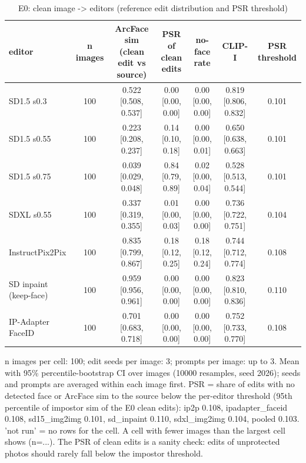 \begin{table}[t]
\centering
\small
\begin{tabular}{lcccccc}
\toprule
editor & n images & ArcFace sim (clean edit vs source) & PSR of clean edits & no-face rate & CLIP-I & PSR threshold \\
\midrule
SD1.5 s0.3 & 100 & 0.522 [0.508, 0.537] & 0.00 [0.00, 0.00] & 0.00 [0.00, 0.00] & 0.819 [0.806, 0.832] & 0.101 \\
SD1.5 s0.55 & 100 & 0.223 [0.208, 0.237] & 0.14 [0.10, 0.18] & 0.00 [0.00, 0.01] & 0.650 [0.638, 0.663] & 0.101 \\
SD1.5 s0.75 & 100 & 0.039 [0.029, 0.048] & 0.84 [0.79, 0.89] & 0.02 [0.00, 0.04] & 0.528 [0.513, 0.544] & 0.101 \\
SDXL s0.55 & 100 & 0.337 [0.319, 0.355] & 0.01 [0.00, 0.03] & 0.00 [0.00, 0.00] & 0.736 [0.722, 0.751] & 0.104 \\
InstructPix2Pix & 100 & 0.835 [0.799, 0.867] & 0.18 [0.12, 0.25] & 0.18 [0.12, 0.24] & 0.744 [0.712, 0.774] & 0.108 \\
SD inpaint (keep-face) & 100 & 0.959 [0.956, 0.961] & 0.00 [0.00, 0.00] & 0.00 [0.00, 0.00] & 0.823 [0.810, 0.836] & 0.110 \\
IP-Adapter FaceID & 100 & 0.701 [0.683, 0.718] & 0.00 [0.00, 0.00] & 0.00 [0.00, 0.00] & 0.752 [0.733, 0.770] & 0.108 \\
\bottomrule
\end{tabular}
\caption{E0: clean image -> editors (reference edit distribution and PSR threshold)}
\label{tab:e0}
\par\footnotesize n images per cell: 100; edit seeds per image: 3; prompts per image: up to 3. Mean with 95\% percentile-bootstrap CI over images (10000 resamples, seed 2026); seeds and prompts are averaged within each image first. PSR = share of edits with no detected face or ArcFace sim to the source below the per-editor threshold (95th percentile of impostor sim of the E0 clean edits): ip2p 0.108, ipadapter\_faceid 0.108, sd15\_img2img 0.101, sd\_inpaint 0.110, sdxl\_img2img 0.104, pooled 0.103. 'not run' = no rows for the cell. A cell with fewer images than the largest cell shows (n=...). The PSR of clean edits is a sanity check: edits of unprotected photos should rarely fall below the impostor threshold.
\end{table}
